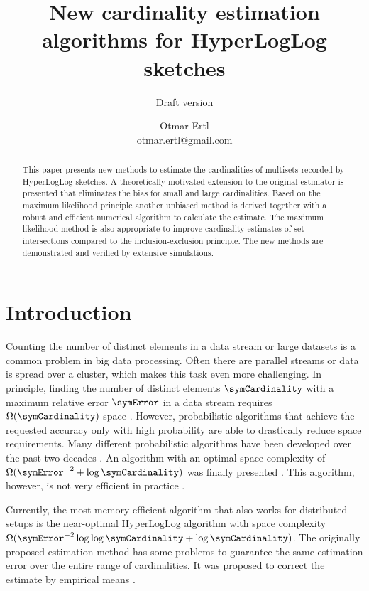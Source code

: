 \documentclass[a4paper]{scrartcl}
\title{New cardinality estimation algorithms for HyperLogLog sketches}
\subtitle{Draft version}
\author{Otmar Ertl \\ otmar.ertl@gmail.com}
\begin{document}
\maketitle
\let\thefootnote\relax{}
\begin{abstract}
This paper presents new methods to estimate the cardinalities of multisets recorded by HyperLogLog sketches. A theoretically motivated extension to the original estimator is presented that eliminates the bias for small and large cardinalities. Based on the maximum likelihood principle another unbiased method is derived together with a robust and efficient numerical algorithm to calculate the estimate. The maximum likelihood method is also appropriate to improve cardinality estimates of set intersections compared to the inclusion-exclusion principle. The new methods are demonstrated and verified by extensive simulations.
\end{abstract}

\section{Introduction}
Counting the number of distinct elements in a data stream or large datasets is a common problem in big data processing. Often there are parallel streams  or data is spread over a cluster, which makes this task even more challenging.
In principle, finding the number of distinct elements $\symCardinality$ with a maximum relative error $\symError$  in a data stream requires $\Omega(\symCardinality)$ space \cite{Alon1999}. However, probabilistic algorithms that achieve the requested accuracy only with high probability are able to drastically reduce space requirements. Many different probabilistic algorithms have been developed over the past two decades \cite{Metwally2008,Ting2014}. An algorithm with an optimal space complexity of $\Omega(\symError^{-2}+\log \symCardinality)$ \cite{Alon1999, Indyk2003} was finally presented \cite{Kane2010}. This algorithm, however, is not very efficient in practice \cite{Ting2014}.

Currently, the most memory efficient algorithm that also works for distributed setups is the near-optimal HyperLogLog algorithm \cite{Flajolet2007} with space complexity $\Omega(\symError^{-2} \log\log\symCardinality +\log \symCardinality)$. The originally proposed estimation method has some problems to guarantee the same estimation error over the entire range of cardinalities. It was proposed to correct the estimate by empirical means \cite{Heule2013,Rhodes2015,Sanfilippo2014}. 
\end{document}
